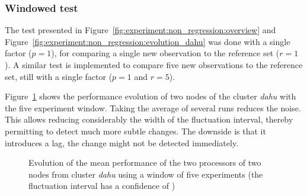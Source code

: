             \subsubsection{Windowed test}%

                The test presented in Figure~\ref{fig:experiment:non_regression:overview} and
                Figure~\ref{fig:experiment:non_regression:evolution_dahu} was done with a single factor (\(p=1\)), for
                comparing a single new observation to the reference set (\(r=1\)). A similar test is implemented to
                compare five new observations to the reference set, still with a single factor (\(p=1\) and \(r=5\)).

                Figure~\ref{fig:experiment:non_regression:evolution_dahu_windowed} shows the performance evolution of
                two nodes of the cluster \emph{dahu} with the five experiment window. Taking the average of several runs
                reduces the noise. This allows reducing considerably the width of the fluctuation interval, thereby
                permitting to detect much more subtle changes. The downside is that it introduces a lag, the change
                might not be detected immediately.

                \begin{figure}[htpb]
                    \centering
                    \caption{Evolution of the mean performance of the two processors of two nodes from cluster
                    \emph{dahu} using a window of five experiments (the fluctuation interval has a confidence of
                    )}%
                    \label{fig:experiment:non_regression:evolution_dahu_windowed}
                \end{figure}

